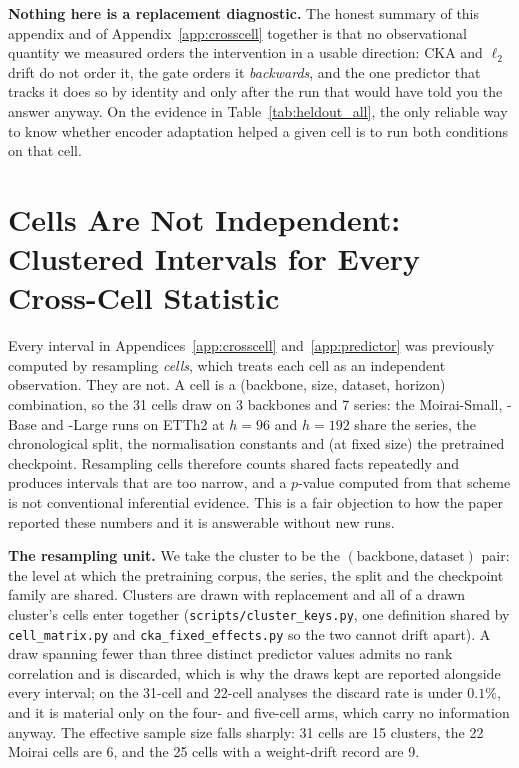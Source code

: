 \textbf{Nothing here is a replacement diagnostic.} The honest summary of this
appendix and of Appendix~\ref{app:crosscell} together is that no observational
quantity we measured orders the intervention in a usable direction: CKA and
$\ell_2$ drift do not order it, the gate orders it \emph{backwards}, and the one
predictor that tracks it does so by identity and only after the run that would
have told you the answer anyway. On the evidence in Table~\ref{tab:heldout_all},
the only reliable way to know whether encoder adaptation helped a given cell is
to run both conditions on that cell.

\section{Cells Are Not Independent: Clustered Intervals for Every Cross-Cell Statistic}
\label{app:clustered}

Every interval in Appendices~\ref{app:crosscell} and~\ref{app:predictor} was
previously computed by resampling \emph{cells}, which treats each cell as an
independent observation. They are not. A cell is a (backbone, size, dataset,
horizon) combination, so the 31 cells draw on 3 backbones and 7 series: the
Moirai-Small, -Base and -Large runs on ETTh2 at $h{=}96$ and $h{=}192$ share the
series, the chronological split, the normalisation constants and (at fixed
size) the pretrained checkpoint. Resampling cells therefore counts shared facts
repeatedly and produces intervals that are too narrow, and a $p$-value computed
from that scheme is not conventional inferential evidence. This is a fair
objection to how the paper reported these numbers and it is answerable without
new runs.

\textbf{The resampling unit.} We take the cluster to be the
$(\text{backbone}, \text{dataset})$ pair: the level at which the pretraining
corpus, the series, the split and the checkpoint family are shared. Clusters are
drawn with replacement and all of a drawn cluster's cells enter together
(\texttt{scripts/cluster\_keys.py}, one definition shared by
\texttt{cell\_matrix.py} and \texttt{cka\_fixed\_effects.py} so the two cannot
drift apart). A draw spanning fewer than three distinct predictor values admits no
rank correlation and is discarded, which is why the draws kept are reported
alongside every interval; on the 31-cell and 22-cell analyses the discard rate is
under $0.1\%$, and it is material only on the four- and five-cell arms, which
carry no information anyway. The effective sample size falls sharply: 31 cells are
15 clusters, the 22 Moirai cells are 6, and the 25 cells with a weight-drift
record are 9.


